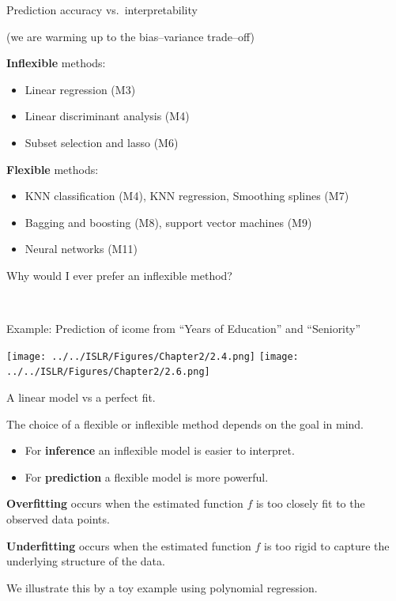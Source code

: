 \documentclass[ignorenonframetext,]{beamer}
\providecommand{\tightlist}{%
  \setlength{\itemsep}{0pt}\setlength{\parskip}{0pt}}
\begin{document}
\begin{frame}{Prediction accuracy vs.~interpretability}

(we are warming up to the bias--variance trade--off)

\textbf{Inflexible} methods:

\begin{itemize}
\tightlist
\item
  Linear regression (M3)
\item
  Linear discriminant analysis (M4)
\item
  Subset selection and lasso (M6)
\end{itemize}

\textbf{Flexible} methods:

\begin{itemize}
\tightlist
\item
  KNN classification (M4), KNN regression, Smoothing splines (M7)
\item
  Bagging and boosting (M8), support vector machines (M9)
\item
  Neural networks (M11)
\end{itemize}

\end{frame}

\begin{frame}

\begin{block}{Why would I ever prefer an inflexible method?}

\(~\)

Example: Prediction of icome from ``Years of Education'' and
``Seniority''\vspace{2mm}

\centering
\texttt{[image: ../../ISLR/Figures/Chapter2/2.4.png]}
\texttt{[image: ../../ISLR/Figures/Chapter2/2.6.png]}

A linear model vs a perfect fit.

\end{block}

\end{frame}

\begin{frame}

The choice of a flexible or inflexible method depends on the goal in
mind.

\begin{itemize}
\tightlist
\item
  For \textbf{inference} an inflexible model is easier to interpret.
\item
  For \textbf{prediction} a flexible model is more powerful.
\end{itemize}

\textbf{Overfitting} occurs when the estimated function \(f\) is too
closely fit to the observed data points.

\textbf{Underfitting} occurs when the estimated function \(f\) is too
rigid to capture the underlying structure of the data.

We illustrate this by a toy example using polynomial regression.

\end{frame}
\end{document}
